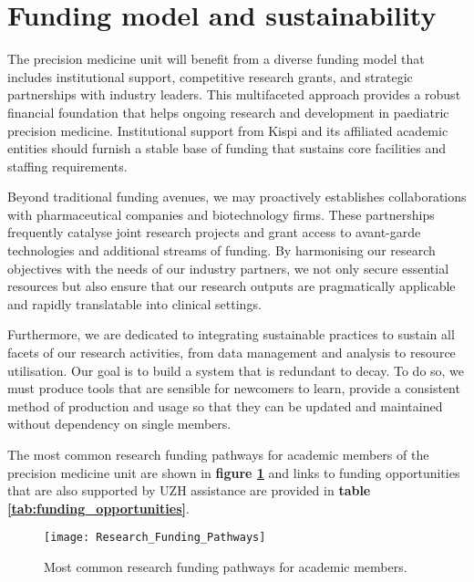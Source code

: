 \section{Funding model and sustainability}

The precision medicine unit will benefit from a diverse funding model that includes institutional support, competitive research grants, and strategic partnerships with industry leaders. This multifaceted approach provides a robust financial foundation that helps ongoing research and development in paediatric precision medicine. Institutional support from Kispi and its affiliated academic entities should furnish a stable base of funding that sustains core facilities and staffing requirements.

Beyond traditional funding avenues, we may proactively establishes collaborations with pharmaceutical companies and biotechnology firms. These partnerships frequently catalyse joint research projects and grant access to avant-garde technologies and additional streams of funding. By harmonising our research objectives with the needs of our industry partners, we not only secure essential resources but also ensure that our research outputs are pragmatically applicable and rapidly translatable into clinical settings.

Furthermore, we are dedicated to integrating sustainable practices to sustain all facets of our research activities, from data management and analysis to  resource utilisation. Our goal is to build a system that is redundant to decay. To do so, we must produce tools that are sensible for newcomers to learn, provide a consistent method of production and usage so that they can be updated and maintained without dependency on single members. 

The most common research funding pathways for academic members of the precision medicine unit are shown in 
\textbf{figure
\ref{fig:Research_Funding_Pathways}} 
and links to funding opportunities that are also supported by UZH assistance are provided in 
\textbf{table
\ref{tab:funding_opportunities}}.

\begin{figure}[h] \hspace*{0cm} 
\begin{center}
	\texttt{[image: Research\_Funding\_Pathways]}
	\caption{Most common research funding pathways for academic members.}
	\label{fig:Research_Funding_Pathways}
\end{center}
\end{figure}

